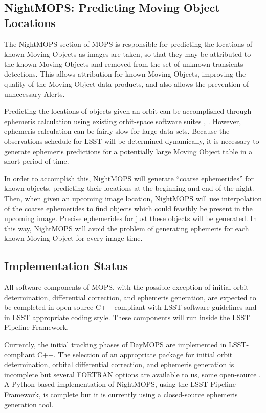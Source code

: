 \subsection{NightMOPS: Predicting Moving Object Locations}

The NightMOPS section of MOPS is responsible for predicting the
locations of known Moving Objects as images are taken, so that they
may be attributed to the known Moving Objects and removed from the set
of unknown transients detections.  This allows attribution for known
Moving Objects, improving the quality of the Moving Object data
products, and also allows the prevention of unnecessary Alerts.

Predicting the locations of objects given an orbit can be accomplished
through ephemeris calculation using existing orbit-space software
suites \citep{Milani2006}, \citep{OpenOrb2009}.  However, ephemeris
calculation can be fairly slow for large data sets.  Because the
observations schedule for LSST will be determined dynamically, it is
necessary to generate ephemeris predictions for a potentially large
Moving Object table in a short period of time.


In order to accomplish this, NightMOPS will generate ``coarse
ephemerides'' for known objects, predicting their locations at the
beginning and end of the night.  Then, when given an upcoming image
location, NightMOPS will use interpolation of the coarse ephemerides
to find objects which could feasibly be present in the upcoming
image. Precise ephemerides for just these objects will be
generated. In this way, NightMOPS will avoid the problem of generating
ephemeris for each known Moving Object for every image time.


\subsection{Implementation Status}

All software components of MOPS, with the possible exception of
initial orbit determination, differential correction, and ephemeris
generation, are expected to be completed in open-source C++ compliant
with LSST software guidelines and in LSST appropriate coding style.
These components will run inside the LSST Pipeline Framework.

Currently, the initial tracking phases of DayMOPS are implemented in
LSST-compliant C++.  The selection of an appropriate package for
initial orbit determination, orbital differential correction, and
ephemeris generation is incomplete but several FORTRAN options are
available to us, some open-source \citep{Milani2006}
\citep{OpenOrb2009}.  A Python-based implementation of NightMOPS,
using the LSST Pipeline Framework, is complete but it is currently
using a closed-source ephemeris generation tool.

